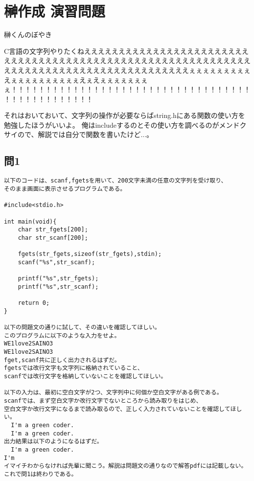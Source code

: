 \section{榊作成 演習問題}
榊くんのぼやき


 C言語の文字列やりたくねえええええええええええええええええええええええええええええええええええええええええええええええええええええええええええええええええええええええええええええええええええええええぇぇぇぇぇぇぇぇぇえぇぇぇぇぇぇぇぇぇぇえぇえぇぇぇぇぇぇぇぇ！！！！！！！！！！！！！！！！！！！！！！！！！！！！！！！！！！！！！！！！！！！！！！！！
 
 
それはおいておいて、文字列の操作が必要ならばstring.hにある関数の使い方を勉強したほうがいいよ。
俺はincludeするのとその使い方を調べるのがメンドクサイので、解説では自分で関数を書いたけど...。

\subsection{問1}
\begin{verbatim}
以下のコードは、scanf,fgetsを用いて、200文字未満の任意の文字列を受け取り、
そのまま画面に表示させるプログラムである。

#include<stdio.h>

int main(void){
    char str_fgets[200];
	char str_scanf[200];
	
    fgets(str_fgets,sizeof(str_fgets),stdin);
    scanf("%s",str_scanf);
	
    printf("%s",str_fgets);
    printf("%s",str_scanf);
	
    return 0;
}

以下の問題文の通りに試して、その違いを確認してほしい。
このプログラムに以下のような入力をせよ。
WE1love2SAINO3
WE1love2SAINO3
fget,scanf共に正しく出力されるはずだ。
fgetsでは改行文字も文字列に格納されていること、
scanfでは改行文字を格納していないことを確認してほしい。

以下の入力は、最初に空白文字が2つ、文字列中に何個か空白文字がある例である。
scanfでは、まず空白文字か改行文字でないところから読み取りをはじめ、
空白文字か改行文字になるまで読み取るので、正しく入力されていないことを確認してほしい。
  I'm a green coder.
  I'm a green coder.
出力結果は以下のようになるはずだ。
  I'm a green coder.
I'm
イマイチわからなければ先輩に聞こう。解説は問題文の通りなので解答pdfには記載しない。
これで問1は終わりである。
\end{verbatim}


